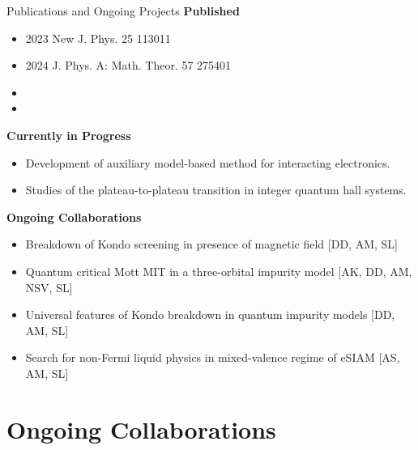 \documentclass[11pt,aspectratio=169]{beamer}
\newcommand\focus[1]{%
	{\alert{\textbf{#1}}}
}
\begin{document}
\begin{frame}{Publications and Ongoing Projects}
\focus{Published}\\[5pt]

\begin{minipage}{0.49\textwidth}
\begin{itemize}
	\item 2023 New J. Phys. 25 113011
	\item 2024 J. Phys. A: Math. Theor. 57 275401
\end{itemize}
\end{minipage}
\begin{minipage}{0.49\textwidth}
\begin{itemize}
	\item {}
	\item {}
\end{itemize}
\end{minipage}

\vspace*{\fill}

\focus{Currently in Progress}
\begin{itemize}
	\item Development of auxiliary model-based method for interacting electronics.
	\item Studies of the plateau-to-plateau transition in integer quantum hall systems.
\end{itemize}

\vspace*{\fill}

\focus{Ongoing Collaborations}

\begin{itemize}
	\item Breakdown of Kondo screening in presence of magnetic field [DD, AM, SL]
	\item Quantum critical Mott MIT in a three-orbital impurity model [AK, DD, AM, NSV, SL]
	\item Universal features of Kondo breakdown in quantum impurity models [DD, AM, SL]
	\item Search for non-Fermi liquid physics in mixed-valence regime of eSIAM [AS, AM, SL]
\end{itemize}
\end{frame}

\section{Ongoing Collaborations}
\end{document}

